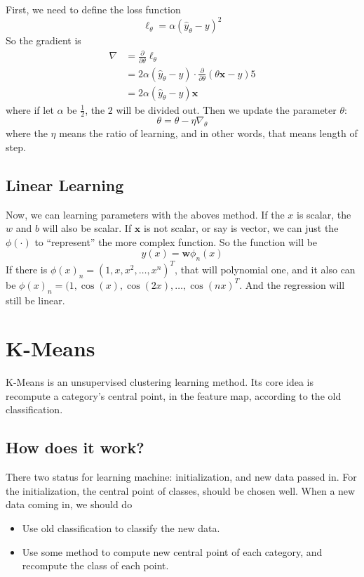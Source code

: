 \documentclass[twoside]{article}
\begin{document}
First, we need  to define the loss function
\[
\ell_\theta = \alpha(\hat{y}_\theta - y)^2
\]
So the gradient is
\begin{align*}
\nabla &= \frac{\partial}{\partial \theta}\ell_\theta \\
       &= 2\alpha (\hat{y}_\theta -y)\cdot \frac{\partial}{\partial \theta}\left(\theta \mathbf{x} - y\right) 5 \\
       &= 2\alpha(\hat{y}_\theta -y)\mathbf{x}
\end{align*}
where if let $\alpha$ be $\frac{1}{2}$, the $2$ will be divided out.
Then we update the parameter $\theta$:
\[
\theta = \theta - \eta\nabla_\theta
\]
where the $\eta$ means the ratio of learning, and in other words, that means length of step.

\subsection{Linear Learning}
\label{sec:lreg:how}

Now, we can learning parameters with the aboves method.
If the $x$ is scalar, the $w$ and $b$ will also be scalar. If $\mathbf{x}$ is not scalar, or say is vector,
we can just the $\phi(\cdot)$ to ``represent'' the more complex function.
So the function will be 
\[
y(x) = \mathbf{w}\phi_n(x)
\]
If there is $\phi(x)_n = (1,x,x^2,\dots,x^n)^T$, that will polynomial one, and it also can be $\phi(x)_n = (1,\cos(x),\cos(2x),\dots,\cos(nx)^T$.
And the regression will still be linear.

\section{K-Means}
\label{sec:kmeans}

K-Means is an unsupervised clustering learning method. Its core idea is recompute a category's central point, in the feature map,  according
to the old classification.

\subsection{How does it work?}
\label{sec:kmeans:how}

There two status for learning machine: initialization, and new data passed in.
For the initialization, the central point of classes, should be chosen well.
When a new data coming in, we should do
\begin{itemize}
	\item Use old classification to classify the new data.
	\item Use some method to compute new central point of each category, and recompute the class of each point.
\end{itemize}
\end{document}
